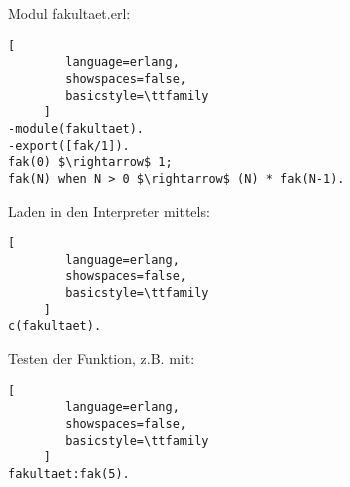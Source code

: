 \documentclass[10pt]{article}
\begin{document}
\begin{itemize*}
Modul fakultaet.erl:
\begin{lstlisting}[
        language=erlang,
        showspaces=false,
        basicstyle=\ttfamily
     ]
-module(fakultaet).
-export([fak/1]).
fak(0) $\rightarrow$ 1;
fak(N) when N > 0 $\rightarrow$ (N) * fak(N-1).
\end{lstlisting}
Laden in den Interpreter mittels:
\begin{lstlisting}[
        language=erlang,
        showspaces=false,
        basicstyle=\ttfamily
     ] 
c(fakultaet).
\end{lstlisting}
Testen der Funktion, z.B. mit:
\begin{lstlisting}[
        language=erlang,
        showspaces=false,
        basicstyle=\ttfamily
     ]
fakultaet:fak(5).
\end{lstlisting}


\end{itemize*}
\end{document}
